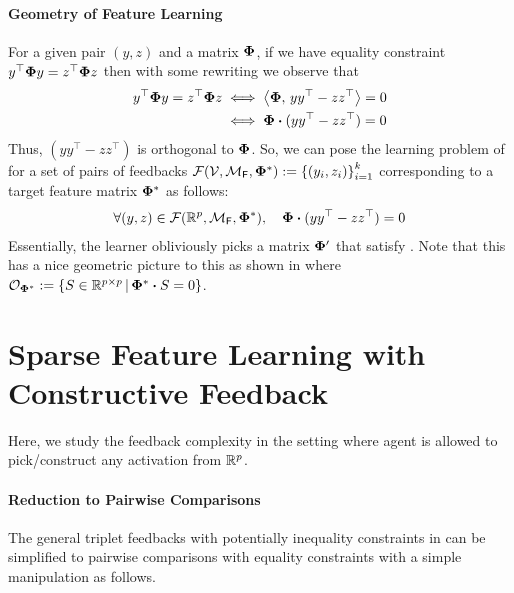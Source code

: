 \paragraph{Geometry of Feature Learning} For a given pair $(y,z)$ and a matrix $\boldsymbol{\Phi}$, if we have equality constraint $y^{\top}\boldsymbol{\Phi} y = z^{\top}\boldsymbol{\Phi} z$ then with some rewriting we observe that
\begin{align*}
    y^{\top}\boldsymbol{\Phi} y = z^{\top}\boldsymbol{\Phi} z &\iff \left<\boldsymbol{\Phi},\, yy^{\top} - zz^{\top}\right> = 0\\ &\iff \boldsymbol{\Phi} \boldsymbol{\cdot} (yy^{\top} - zz^{\top}) = 0
\end{align*}
Thus, $(yy^{\top} - zz^{\top})$ is orthogonal to $\boldsymbol{\Phi} $. So, we can pose the learning problem of  for a set of pairs of feedbacks ${\mathcal{F}}({\mathcal{V}},{\mathcal{M}}_{\mathsf{F}},\boldsymbol{\Phi}^*) := \left\{(y_i,z_i)\right\}_{i=1}^k $ corresponding to a target feature matrix $\boldsymbol{\Phi}^*$ as follows:
\begin{align}
  \forall (y,z) \in {\mathcal{F}}(\mathbb{R}^p,{\mathcal{M}}_{\mathsf{F}},\boldsymbol{\Phi}^*), \quad \boldsymbol{\Phi} \boldsymbol{\cdot} (yy^{\top} - zz^{\top})  = 0 \label{eq: orthosat}
\end{align}
Essentially, the learner obliviously picks a matrix $\boldsymbol{\Phi}'$ that satisfy . Note that this has a nice geometric picture to this as shown in  where $\mathcal{O}_{\boldsymbol{\Phi}^*} := \left\{S \in \mathbb{R}^{p \times p} \,|\, \boldsymbol{\Phi}^* \boldsymbol{\cdot} S = 0\right\}$.
\fi

\section{Sparse Feature Learning with Constructive
Feedback}\label{sec: construct}
Here, we study the feedback complexity in the setting where agent is allowed to pick/construct any activation from $\mathbb{R}^p$. 


\paragraph{Reduction to Pairwise Comparisons}
The general triplet feedbacks with potentially inequality constraints in 
 can be simplified to pairwise comparisons with equality constraints with a simple manipulation as follows. %

